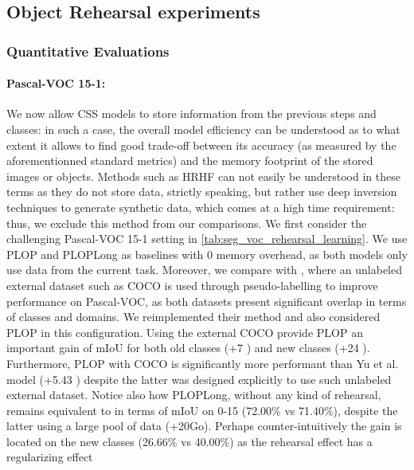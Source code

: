 \subsection{Object Rehearsal experiments}

\subsubsection{Quantitative Evaluations}



\paragraph{Pascal-VOC 15-1:} We now allow \ac{CSS} models to store information from the previous
steps and classes: in such a case, the overall model efficiency can be understood as to what extent
it allows to find good trade-off between its accuracy (as measured by the aforementionned standard
metrics) and the memory footprint of the stored images or objects. Methods such as HRHF
\citep{huang2021halfrealhalffake} can not easily be understood in these terms as they do not store
data, strictly speaking, but rather use deep inversion \citep{yin20deepinversion} techniques to
generate synthetic data, which comes at a high time requirement: thus, we exclude this method from
our comparisons. We first consider the challenging Pascal-VOC 15-1 setting in
\autoref{tab:seg_voc_rehearsal_learning}. We use PLOP and PLOPLong as baselines with 0 memory
overhead, as both models only use data from the current task. Moreover, we compare with
\cite{yu2020continualsegmentationselftraining}, where an unlabeled external dataset such as COCO
\citep{lin2014mscocodataset} is used through pseudo-labelling to improve performance on Pascal-VOC,
as both datasets present significant overlap in terms of classes and domains. We reimplemented their
method and also considered PLOP in this configuration. Using the external COCO provide PLOP an
important gain of \ac{mIoU} for both old classes (+7 \pp) and new classes (+24
\pp). Furthermore, PLOP with COCO is significantly more performant than Yu et al. model
(+5.43 \pp) despite the latter was designed explicitly to use such unlabeled external
dataset. Notice also how PLOPLong, without any kind of rehearsal, remains equivalent to
\cite{yu2020continualsegmentationselftraining} in terms of \ac{mIoU} on 0-15 (72.00\% vs 71.40\%),
despite the latter using a large pool of data (+20Go). Perhaps counter-intuitively the gain is
located on the new classes (26.66\% vs 40.00\%) as the rehearsal effect has a regularizing effect

